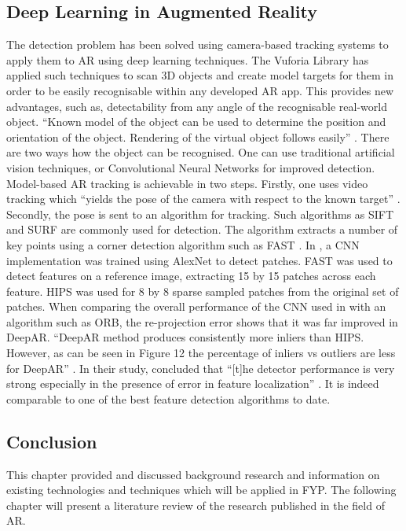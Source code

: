 \documentclass{aifyp}
\begin{document}
\subsection{Deep Learning in Augmented Reality}
The detection problem has been solved using camera-based tracking systems to apply them to AR using deep learning techniques. The Vuforia Library has applied such techniques to scan 3D objects and create model targets for them in order to be easily recognisable within any developed AR app. This provides new advantages, such as, detectability from any angle of the recognisable real-world object. “Known model of the object can be used to determine the position and orientation of the object. Rendering of the virtual object follows easily” \cite{Akgul2016ApplyingDL}. There are two ways how the object can be recognised. One can use traditional artificial vision techniques, or Convolutional Neural Networks for improved detection.
\newline
\newline
\indent Model-based AR tracking is achievable in two steps. Firstly, one uses video tracking which “yields the pose of the camera with respect to the known target” \cite{Akgul2016ApplyingDL}. Secondly, the pose is sent to an algorithm for tracking. Such algorithms as SIFT \cite{SIFT} and SURF \cite{SURF} are commonly used for detection. The algorithm extracts a number of key points using a corner detection algorithm such as FAST \cite{CornerDetection}. In \cite{ Akgul2016ApplyingDL}, a CNN implementation was trained using AlexNet to detect patches. FAST was used to detect features on a reference image, extracting 15 by 15 patches across each feature. HIPS \cite{Taylor2011} was used for 8 by 8 sparse sampled patches from the original set of patches. When comparing the overall performance of the CNN used in \cite{Akgul2016ApplyingDL} with an algorithm such as ORB, the re-projection error shows that it was far improved in DeepAR. “DeepAR method produces consistently more inliers than HIPS. However, as can be seen in Figure 12 the percentage of inliers vs outliers are less for DeepAR” \cite{ Akgul2016ApplyingDL}.
\newline
\newline
\indent In their study, \cite{ Akgul2016ApplyingDL} concluded that “[t]he detector performance is very strong especially in the presence of error in feature localization” \cite{ Akgul2016ApplyingDL}. It is indeed comparable to one of the best feature detection algorithms to date.
\subsection{Conclusion}
This chapter provided and discussed background research and information on existing technologies and techniques which will be applied in FYP. The following chapter will present a literature review of the research published in the field of AR.
\newpage
\end{document}
